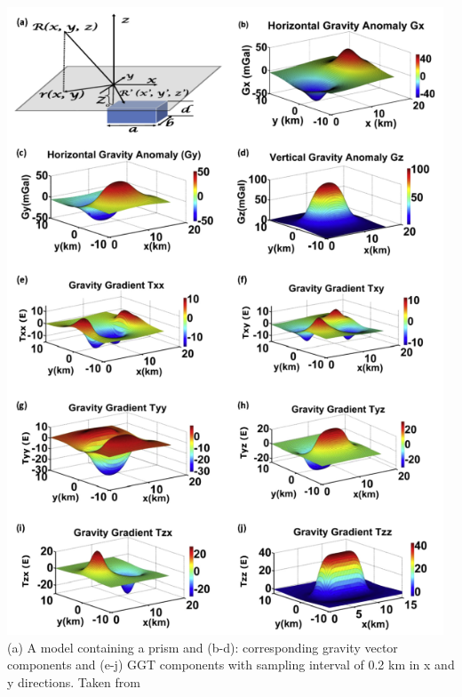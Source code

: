 \begin{center}
\includegraphics[width=13cm]{images/gravity/duti16a}\\
{\captionfont (a) A model containing a prism and (b-d): corresponding gravity vector components and 
(e-j) GGT components with sampling interval of 0.2 km in x and y directions. Taken from \cite{duti16}}
\end{center}

